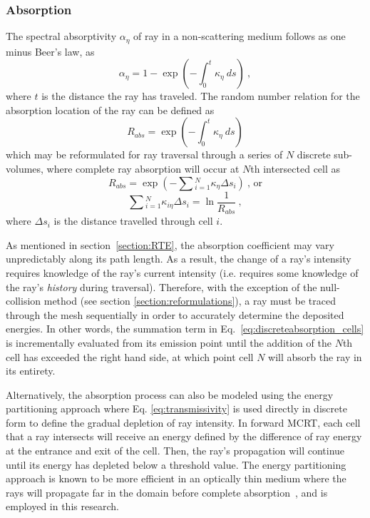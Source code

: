\subsubsection{Absorption}
The spectral absorptivity $\alpha{}_\eta{}$ of ray in a non-scattering medium follows as one minus Beer's law, as
\begin{equation}
    \alpha{}_\eta{}=1-\exp{\left(-\int^{t}_0\kappa{}_\eta{}~ds\right)}~,
    \label{eq:transmissivity}
\end{equation}
where $t$ is the distance the ray has traveled. The random number relation for the absorption location of the ray can be defined as
\begin{equation}
    R_{abs}=\exp{\left(-\int_0^{t}\kappa_\eta{}~ds\right)}
    \label{eq:discreteabsorption}
\end{equation}
which may be reformulated for ray traversal through a series of $N$ discrete sub-volumes, where complete ray absorption will occur at $N$th intersected cell as
\begin{equation}
    R_{abs}=\exp{\left(-\sum{}_{i=1}^N\kappa_\eta{}\Delta{}s_i\right)}~\text{, or}
\end{equation}
\begin{equation}
    \sum{}_{i=1}^N\kappa_{i\eta{}}\Delta{s_i}=\ln{\frac{1}{R_{abs}}}~,
    \label{eq:discreteabsorption_cells}
\end{equation}
where $\Delta{s}_i$ is the distance travelled through cell $i$.

As mentioned in section~\ref{section:RTE}, the absorption coefficient may vary unpredictably along its path length. As a result, the change of a ray's intensity requires knowledge of the ray's current intensity (i.e. requires some knowledge of the ray's \textit{history} during traversal).  
Therefore, with the exception of the null-collision method (see section \ref{section:reformulations}), a ray must be traced through the mesh sequentially in order to accurately determine the deposited energies. In other words, the summation term in Eq.~\ref{eq:discreteabsorption_cells} is incrementally evaluated from its emission point until the addition of the $N$th cell has exceeded the right hand side, at which point cell $N$ will absorb the ray in its entirety.

Alternatively, the absorption process can also be modeled using the energy partitioning approach where Eq. \ref{eq:transmissivity} is used directly in discrete form to define the gradual depletion of ray intensity. 
In forward MCRT, each cell that a ray intersects will receive an energy defined by the difference of ray energy at the entrance and exit of the cell. Then, the ray's propagation will continue until its energy has depleted below a threshold value.
The energy partitioning approach is known to be more efficient in an optically thin medium where the rays will propagate far in the domain before complete absorption~\cite{Modest2013RadiativeTransfer,Liu2020TheFlames}, and is employed in this research.

